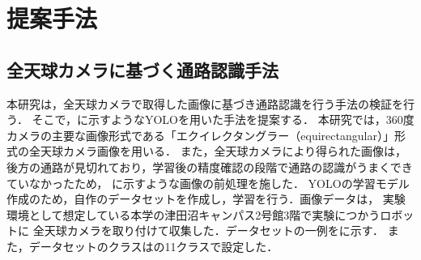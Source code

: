 \documentclass[../main]{subfiles}
\begin{document}
\setcounter{secnumdepth}{2}
    \chapter{提案手法}
        \section{全天球カメラに基づく通路認識手法}
        本研究は，全天球カメラで取得した画像に基づき通路認識を行う手法の検証を行う．
        そこで，に示すようなYOLOを用いた手法を提案する．
        本研究では，360度カメラの主要な画像形式である「エクイレクタングラー（equirectangular）」形式の全天球カメラ画像を用いる．
        また，全天球カメラにより得られた画像は，後方の通路が見切れており，学習後の精度確認の段階で通路の認識がうまくできていなかったため，
        に示すような画像の前処理を施した．
        YOLOの学習モデル作成のため，自作のデータセットを作成し，学習を行う．画像データは，
        実験環境として想定している本学の津田沼キャンパス2号館3階で実験につかうロボットに
        全天球カメラを取り付けて収集した．データセットの一例をに示す．
        また，データセットのクラスはの11クラスで設定した．
        
\end{document}
